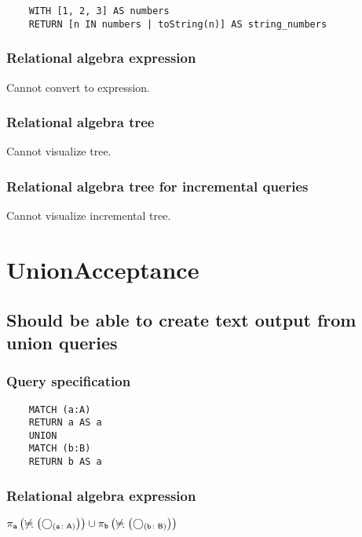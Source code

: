 	\begin{lstlisting}
	WITH [1, 2, 3] AS numbers
	RETURN [n IN numbers | toString(n)] AS string_numbers
	\end{lstlisting}


	\subsubsection*{Relational algebra expression}

	Cannot convert to expression.

	\subsubsection*{Relational algebra tree}

	Cannot visualize tree.

	\subsubsection*{Relational algebra tree for incremental queries}

	Cannot visualize incremental tree.

	\section{UnionAcceptance}

	\subsection{Should be able to create text output from union queries}

	\subsubsection*{Query specification}

	\begin{lstlisting}
	MATCH (a:A)
	RETURN a AS a
	UNION
	MATCH (b:B)
	RETURN b AS a
	\end{lstlisting}


	\subsubsection*{Relational algebra expression}

	$\projection{\var{a}} \left(\alldifferent{} \left(\getvertices{a}{A}\right)\right) \union \projection{\var{b}} \left(\alldifferent{} \left(\getvertices{b}{B}\right)\right)$

